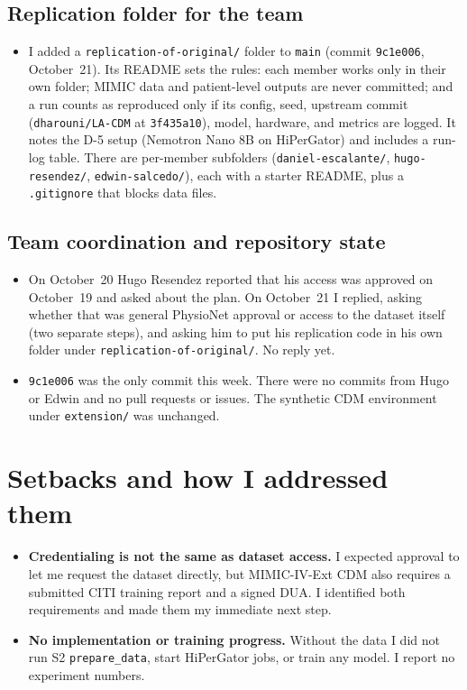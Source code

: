 \documentclass[11pt,letterpaper]{article}
\begin{document}
\subsection{Replication folder for the team}
\begin{itemize}
  \item I added a \texttt{replication-of-original/} folder to \texttt{main} (commit \texttt{9c1e006}, October~21). Its README sets the rules: each member works only in their own folder; MIMIC data and patient-level outputs are never committed; and a run counts as reproduced only if its config, seed, upstream commit (\texttt{dharouni/LA-CDM} at \texttt{3f435a10}), model, hardware, and metrics are logged. It notes the D-5 setup (Nemotron Nano 8B on HiPerGator) and includes a run-log table. There are per-member subfolders (\texttt{daniel-escalante/}, \texttt{hugo-resendez/}, \texttt{edwin-salcedo/}), each with a starter README, plus a \texttt{.gitignore} that blocks data files.
\end{itemize}

\subsection{Team coordination and repository state}
\begin{itemize}
  \item On October~20 Hugo Resendez reported that his access was approved on October~19 and asked about the plan. On October~21 I replied, asking whether that was general PhysioNet approval or access to the dataset itself (two separate steps), and asking him to put his replication code in his own folder under \texttt{replication-of-original/}. No reply yet.
  \item \texttt{9c1e006} was the only commit this week. There were no commits from Hugo or Edwin and no pull requests or issues. The synthetic CDM environment under \texttt{extension/} was unchanged.
\end{itemize}

\section{Setbacks and how I addressed them}
\begin{itemize}
  \item \textbf{Credentialing is not the same as dataset access.} I expected approval to let me request the dataset directly, but MIMIC-IV-Ext CDM also requires a submitted CITI training report and a signed DUA. I identified both requirements and made them my immediate next step.
  \item \textbf{No implementation or training progress.} Without the data I did not run S2 \texttt{prepare\_data}, start HiPerGator jobs, or train any model. I report no experiment numbers.
\end{itemize}
\end{document}

